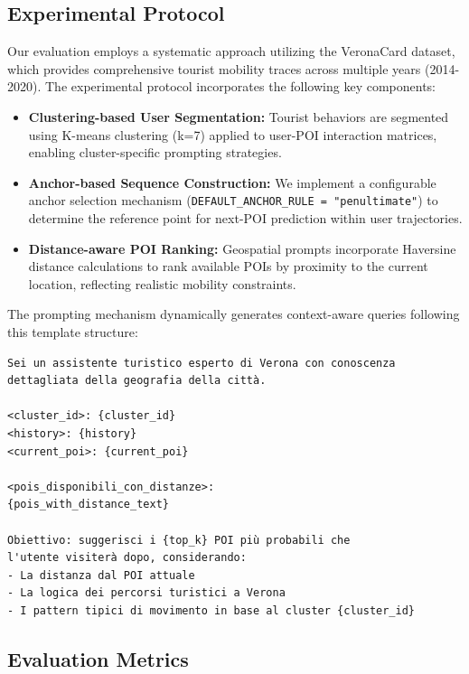 \documentclass[12pt,a4paper]{article}
\begin{document}
\subsection{Experimental Protocol}

Our evaluation employs a systematic approach utilizing the VeronaCard dataset, which provides comprehensive tourist mobility traces across multiple years (2014-2020). The experimental protocol incorporates the following key components:

\begin{itemize}
\item \textbf{Clustering-based User Segmentation:} Tourist behaviors are segmented using K-means clustering (k=7) applied to user-POI interaction matrices, enabling cluster-specific prompting strategies.
\item \textbf{Anchor-based Sequence Construction:} We implement a configurable anchor selection mechanism (\texttt{DEFAULT\_ANCHOR\_RULE = "penultimate"}) to determine the reference point for next-POI prediction within user trajectories.
\item \textbf{Distance-aware POI Ranking:} Geospatial prompts incorporate Haversine distance calculations to rank available POIs by proximity to the current location, reflecting realistic mobility constraints.
\end{itemize}

The prompting mechanism dynamically generates context-aware queries following this template structure:

\begin{lstlisting}[language=text, caption=Comprehensive Context Prompt Template]
Sei un assistente turistico esperto di Verona con conoscenza 
dettagliata della geografia della città.

<cluster_id>: {cluster_id}
<history>: {history}
<current_poi>: {current_poi}

<pois_disponibili_con_distanze>:
{pois_with_distance_text}

Obiettivo: suggerisci i {top_k} POI più probabili che 
l'utente visiterà dopo, considerando:
- La distanza dal POI attuale
- La logica dei percorsi turistici a Verona
- I pattern tipici di movimento in base al cluster {cluster_id}
\end{lstlisting}

\subsection{Evaluation Metrics}
\end{document}
